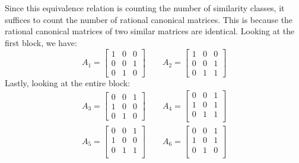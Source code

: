 \documentclass[crop=false,class=article]{standalone}                           %
\begin{document}
    \section{}
        Since this equivalence relation is counting the number of similarity
        classes, it suffices to count the number of rational canonical matrices.
        This is because the rational canonical matrices of two similar matrices
        are identical. Looking at the first block, we have:
        \begin{equation}
            A_{1}=
            \begin{bmatrix}
                1&0&0\\
                0&0&1\\
                0&1&0
            \end{bmatrix}
            \quad\quad
            A_{2}=
            \begin{bmatrix}
                1&0&0\\
                0&0&1\\
                0&1&1
            \end{bmatrix}
        \end{equation}
        Lastly, looking at the entire block:
        \begin{align}
            A_{3}=
            \begin{bmatrix}
                0&0&1\\
                1&0&0\\
                0&1&0
            \end{bmatrix}
            \quad\quad
            A_{4}=
            \begin{bmatrix}
                0&0&1\\
                1&0&1\\
                0&1&1\\
            \end{bmatrix}\\
            A_{5}=
            \begin{bmatrix}
                0&0&1\\
                1&0&0\\
                0&1&1\\
            \end{bmatrix}
            \quad\quad
            A_{6}=
            \begin{bmatrix}
                0&0&1\\
                1&0&1\\
                0&1&0\\
            \end{bmatrix}
        \end{align}
\end{document}
